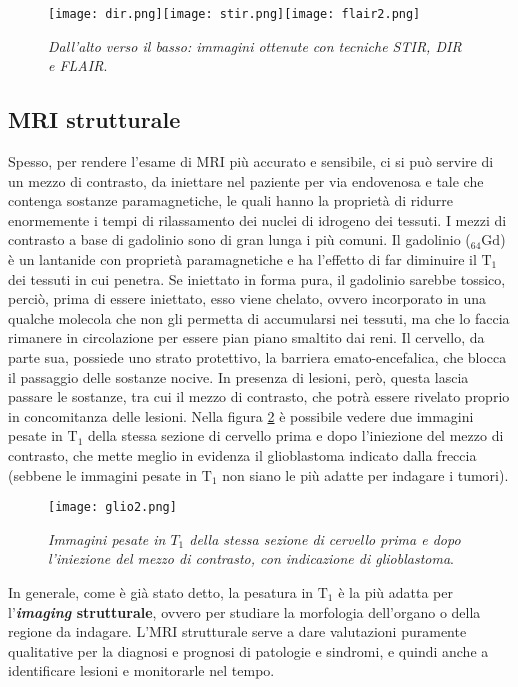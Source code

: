 \documentclass{report}
\newcommand{\figref}[1]{figura \ref{#1}}
\numberwithin{equation}{section}
\numberwithin{figure}{section}
\begin{document}
\begin{figure}[htp]
\centering
\texttt{[image: dir.png]}\quad\texttt{[image: stir.png]}\quad\texttt{[image: flair2.png]}
\caption{\label{fig:flair2} \textit{Dall'alto verso il basso: immagini ottenute con tecniche STIR, DIR e FLAIR}.}
\end{figure}

\subsection{MRI strutturale}
Spesso, per rendere l'esame di MRI più accurato e sensibile, ci si può servire di un mezzo di contrasto, da iniettare nel paziente per via endovenosa e tale che contenga sostanze paramagnetiche, le quali hanno la proprietà di ridurre enormemente i tempi di rilassamento dei nuclei di idrogeno dei tessuti. I mezzi di contrasto a base di gadolinio sono di gran lunga i più comuni. Il gadolinio ($\mathrm{_{64}Gd}$) è un lantanide con proprietà paramagnetiche e ha l'effetto di far diminuire il $\mathrm{T_1}$ dei tessuti in cui penetra. Se iniettato in forma pura, il gadolinio sarebbe tossico, perciò, prima di essere iniettato, esso viene chelato, ovvero incorporato in una qualche molecola che non gli permetta di accumularsi nei tessuti, ma che lo faccia rimanere in circolazione per essere pian piano smaltito dai reni. Il cervello, da parte sua, possiede uno strato protettivo, la barriera emato-encefalica, che blocca il passaggio delle sostanze nocive. In presenza di lesioni, però, questa lascia passare le sostanze, tra cui il mezzo di contrasto, che potrà essere rivelato proprio in concomitanza delle lesioni. Nella \figref{fig:glio2} è possibile vedere due immagini pesate in $\mathrm{T_1}$ della stessa sezione di cervello prima e dopo l'iniezione del mezzo di contrasto, che mette meglio in evidenza il glioblastoma indicato dalla freccia (sebbene le immagini pesate in $\mathrm{T_1}$ non siano le più adatte per indagare i tumori).

\begin{figure}[H]
\centering
\texttt{[image: glio2.png]}
\caption{\label{fig:glio2} \textit{Immagini pesate in $T_1$ della stessa sezione di cervello prima e dopo l'iniezione del mezzo di contrasto, con indicazione di glioblastoma}.}
\end{figure}

In generale, come è già stato detto, la pesatura in $\mathrm{T_1}$ è la più adatta per l'\textbf{\textit{imaging} strutturale}, ovvero per studiare la morfologia dell'organo o della regione da indagare. L'MRI strutturale serve a dare valutazioni puramente qualitative per la diagnosi e prognosi di patologie e sindromi, e quindi anche a identificare lesioni e monitorarle nel tempo.
\end{document}
